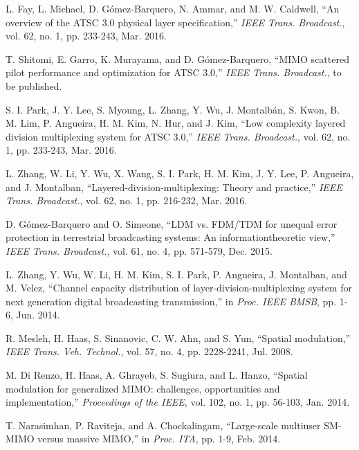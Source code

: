 \documentclass[journal]{IEEEtran}
\begin{document}
\begin{thebibliography}{1}

L. Fay, L. Michael, D. G\'{o}mez-Barquero, N. Ammar, and M. W. Caldwell, ``An overview of the ATSC 3.0 physical layer specification,'' \emph{IEEE Trans. Broadcast.}, vol. 62, no. 1, pp. 233-243, Mar. 2016.

T. Shitomi, E. Garro, K. Murayama, and D. G\'{o}mez-Barquero, ``MIMO scattered pilot performance and optimization for ATSC 3.0,'' \emph{IEEE Trans. Broadcast.}, to be published.

S. I. Park, J. Y. Lee, S. Myoung, L. Zhang, Y. Wu, J. Montalb\'{a}n, S. Kwon, B. M. Lim, P. Angueira, H. M. Kim, N. Hur, and J. Kim, ``Low complexity layered division multiplexing system for ATSC 3.0,'' \emph{IEEE Trans. Broadcast.}, vol. 62, no. 1, pp. 233-243, Mar. 2016.

L. Zhang, W. Li, Y. Wu, X. Wang, S. I. Park, H. M. Kim, J. Y. Lee, P. Angueira, and J. Montalban, ``Layered-division-multiplexing: Theory and practice,'' \emph{IEEE Trans. Broadcast.}, vol. 62, no. 1, pp. 216-232, Mar. 2016.

D. G\'{o}mez-Barquero and O. Simeone, ``LDM vs. FDM/TDM for unequal error protection in terrestrial broadcasting systems: An informationtheoretic view,'' \emph{IEEE Trans. Broadcast.}, vol. 61, no. 4, pp. 571-579, Dec. 2015.

L. Zhang, Y. Wu, W. Li, H. M. Kim, S. I. Park, P. Angueira, J. Montalban, and M. Velez, ``Channel capacity distribution of layer-division-multiplexing system for next generation digital broadcasting transmission,'' in \emph{Proc. IEEE BMSB}, pp. 1-6, Jun. 2014.

R. Mesleh, H. Haas, S. Sinanovic, C. W. Ahn, and S. Yun, ``Spatial modulation,'' \emph{IEEE Trans. Veh. Technol.}, vol. 57, no. 4, pp. 2228-2241, Jul. 2008.

M. Di Renzo, H. Haas, A. Ghrayeb, S. Sugiura, and L. Hanzo, ``Spatial modulation for generalized MIMO: challenges, opportunities and implementation,'' \emph{Proceedings of the IEEE}, vol. 102, no. 1, pp. 56-103, Jan. 2014.

T. Narasimhan, P. Raviteja, and A. Chockalingam, ``Large-scale multiuser SM-MIMO versus massive MIMO,'' in \emph{Proc. ITA}, pp. 1-9, Feb. 2014.


\end{thebibliography}
\end{document}
